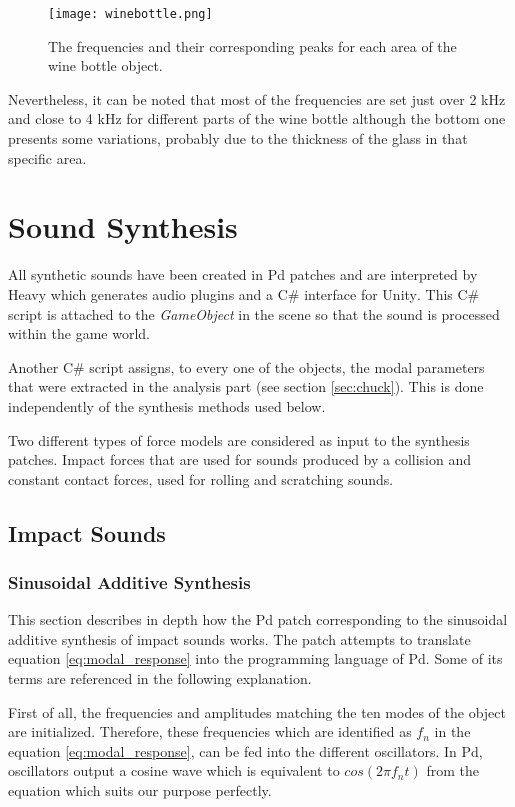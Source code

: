 \begin{figure}[H]
  \centering
    \texttt{[image: winebottle.png]}
      \caption{The frequencies and their corresponding peaks for each area of the wine bottle object.}\label{fig:bottle_data}
\end{figure}

Nevertheless, it can be noted that most of the frequencies are set just over 2 kHz and close to 4 kHz for different parts of the wine bottle although the bottom one presents some variations, probably due to the thickness of the glass in that specific area.

\section{Sound Synthesis}\label{sec:synthesis_implem}

All synthetic sounds have been created in \gls{Pd} patches and are interpreted by Heavy which generates audio plugins and a C\# interface for Unity\textsuperscript{\textregistered}. This C\# script is attached to the \textit{GameObject} in the scene so that the sound is processed within the game world.


Another C\# script assigns, to every one of the objects, the modal parameters that were extracted in the analysis part (see section \ref{sec:chuck}). This is done independently of the synthesis methods used below.

Two different types of force models are considered as input to the synthesis patches. Impact forces that are used for sounds produced by a collision and constant contact forces, used for rolling and scratching sounds.

\subsection{Impact Sounds}\label{sec:impact_synth}
\subsubsection{Sinusoidal Additive Synthesis}\label{sec:sinusoidal_synth}

This section describes in depth how the \gls{Pd} patch corresponding to the sinusoidal additive synthesis of impact sounds works. The patch attempts to translate equation \ref{eq:modal_response} into the programming language of \gls{Pd}. Some of its terms are referenced in the following explanation.

First of all, the frequencies and amplitudes matching the ten modes of the object are initialized. Therefore, these frequencies which are identified as $f_n$ in the equation \ref{eq:modal_response}, can be fed into the different oscillators. In \gls{Pd}, oscillators output a cosine wave which is equivalent to $cos(2 \pi f_nt)$ from the equation which suits our purpose perfectly.

